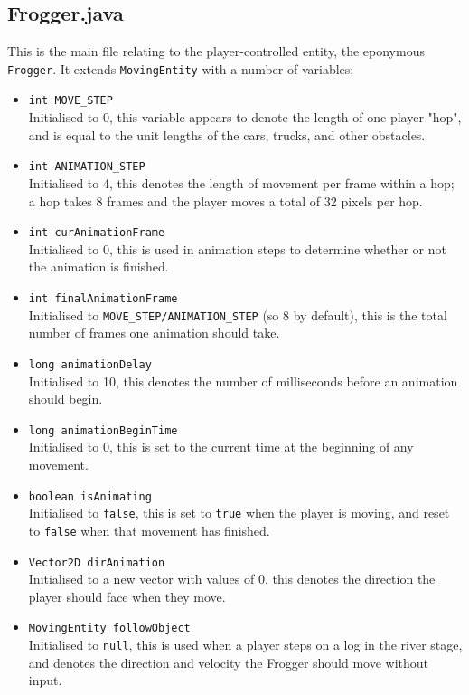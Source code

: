 \documentclass[12pt]{article}
\begin{document}
\subsection{Frogger.java}
This is the main file relating to the player-controlled entity, the eponymous \verb|Frogger|.
It extends \verb|MovingEntity| with a number of variables:
\begin{itemize}
  \item \verb|int MOVE_STEP|\\
    Initialised to 0, this variable appears to denote the length of one player "hop", and is equal to the unit lengths of the cars, trucks, and other obstacles.
  \item \verb|int ANIMATION_STEP|\\
    Initialised to 4, this denotes the length of movement per frame within a hop; a hop takes 8 frames and the player moves a total of 32 pixels per hop.
  \item \verb|int curAnimationFrame|\\
    Initialised to 0, this is used in animation steps to determine whether or not the animation is finished.
  \item \verb|int finalAnimationFrame|\\
    Initialised to \verb|MOVE_STEP/ANIMATION_STEP| (so 8 by default), this is the total number of frames one animation should take.
  \item \verb|long animationDelay|\\
    Initialised to 10, this denotes the number of milliseconds before an animation should begin.
  \item \verb|long animationBeginTime|\\
    Initialised to 0, this is set to the current time at the beginning of any movement.
  \item \verb|boolean isAnimating|\\
    Initialised to \verb|false|, this is set to \verb|true| when the player is moving, and reset to \verb|false| when that movement has finished.
  \item \verb|Vector2D dirAnimation|\\
    Initialised to a new vector with values of 0, this denotes the direction the player should face when they move.
  \item \verb|MovingEntity followObject|\\
    Initialised to \verb|null|, this is used when a player steps on a log in the river stage, and denotes the direction and velocity the Frogger should move without input.

\end{itemize}
\end{document}
